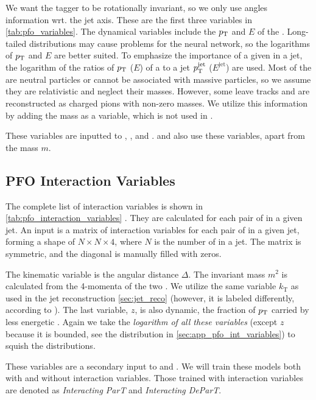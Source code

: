 We want the tagger to be rotationally invariant, so we only use angles information wrt. the jet axis.
These are the first three variables in \cref{tab:pfo_variables}.
The dynamical variables include the $p_\text{T}$ and $E$ of the \PFO.
Long-tailed distributions may cause problems for the neural network, so the logarithms of $p_\text{T}$ and $E$ are better suited. 
To emphasize the importance of a given \PFO in a jet, the logarithm of the ratios of $p_\text{T}$ ($E$) of a \PFO to a jet $p_\text{T}^\mathrm{jet}$ ($E^\mathrm{jet}$) are used.
Most of the \PFOs are neutral particles or cannot be associated with massive particles, so we assume they are relativistic and neglect their masses.
However, some leave tracks and are reconstructed as charged pions with non-zero masses.
We utilize this information by adding the mass as a variable, which is not used in \cite{part}.

These variables are inputted to \trans, \ParT, and \depart.
\PFN and \EFN also use these variables, apart from the mass $m$.

\subsection{PFO Interaction Variables}
\label{sec:pfo_interaction_variables}

The complete list of \PFO interaction variables is shown in \cref{tab:pfo_interaction_variables} \cite{part}.
They are calculated for each pair of \PFOs in a given jet.
An input is a matrix of \PFO interaction variables for each pair of \PFOs in a given jet, forming a shape of $N \times N \times 4$, where $N$ is the number of \PFOs in a jet.
The matrix is symmetric, and the diagonal is manually filled with zeros.

The kinematic variable is the angular distance $\Delta$.
The invariant mass $m^2$ is calculated from the 4-momenta of the two \PFOs.
We utilize the same variable $k_\mathrm{T}$ as used in the jet reconstruction \cref{sec:jet_reco} (however, it is labeled differently, according to \cite{part}).
The last variable, $z$, is also dynamic, the fraction of $p_\text{T}$ carried by less energetic \PFO.
Again we take the \emph{logarithm of all these variables} (except $z$ because it is bounded, see the distribution in \cref{sec:app_pfo_int_variables}) to squish the distributions. 

These variables are a secondary input to \ParT and \depart.
We will train these models both with and without interaction variables.
Those trained with interaction variables are denoted as \emph{Interacting ParT} and \emph{Interacting DeParT}.

